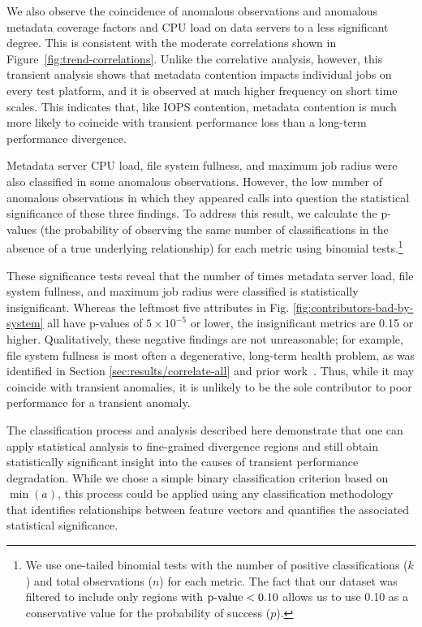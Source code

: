 We also observe the coincidence of anomalous observations and anomalous metadata coverage factors and CPU load on data servers to a less significant degree.
This is consistent with the moderate correlations shown in Figure~\ref{fig:trend-correlations}.
Unlike the correlative analysis, however, this transient analysis shows that metadata contention impacts individual jobs on every test platform, and it is observed at much higher frequency on short time scales.
This indicates that, like IOPS contention, metadata contention is much more likely to coincide with transient performance loss than a long-term performance divergence.

Metadata server CPU load, file system fullness, and maximum job radius were also classified in some anomalous observations.
However, the low number of anomalous observations in which they appeared calls into question the statistical significance of these three findings.
To address this result, we calculate the p-values (the probability of observing the same number of classifications in the absence of a true underlying relationship) for each metric using binomial tests.\footnote{
We use one-tailed binomial tests with the number of positive classifications ($k$) and total observations ($n$) for each metric.
The fact that our dataset was filtered to include only  regions with ${\textup{p-value} < 0.10}$ allows us to use 0.10 as a conservative value for the probability of success ($p$).}

These significance tests reveal that the number of times metadata server load, file system fullness, and maximum job radius were classified is statistically insignificant.
Whereas the leftmost five attributes in Fig. \ref{fig:contributors-bad-by-system} all have p-values of ${5 \times 10^{-5}}$ or lower, the insignificant metrics are 0.15 or higher.
Qualitatively, these negative findings are not unreasonable; for example, file system fullness is most often a degenerative, long-term health problem, as was identified in Section \ref{sec:results/correlate-all} and prior work~\cite{oral2014best,Lockwood2017}.
Thus, while it may coincide with transient anomalies, it is unlikely to be the sole contributor to poor performance for a transient anomaly.

The classification process and analysis described here demonstrate that one can apply statistical analysis to fine-grained divergence regions and still obtain statistically significant insight into the causes of transient performance degradation.
While we chose a  simple binary classification criterion based on $\min(a)$, this process could be applied using any classification methodology that identifies relationships between feature vectors and quantifies the associated statistical significance.
